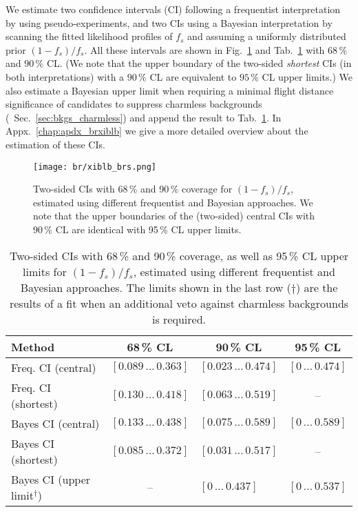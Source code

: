 We estimate two confidence intervals (CI) following a frequentist interpretation by using pseudo-experiments, and two CIs using a Bayesian interpretation by scanning the fitted likelihood profiles of $f_s$ and assuming a uniformly distributed prior $(1 - f_s) / f_s$.
All these intervals are shown in Fig.~\ref{fig:br_xiblb_brs} and Tab.~\ref{tab:br_xiblb_brs} with $68\,\%$ and $90\,\%$ CL.
(We note that the upper boundary of the two-sided \textit{shortest} CIs (in both interpretations) with a $90\,\%$ CL are equivalent to $95\,\%$ CL upper limits.)
We also estimate a Bayesian upper limit when requiring a minimal flight distance significance of \Dz candidates to suppress charmless \Xibz backgrounds (\cf{}~Sec.~\ref{sec:bkgs_charmless}) and append the result to Tab.~\ref{tab:br_xiblb_brs}.
In Appx.~\ref{chap:apdx_brxiblb} we give a more detailed overview about the estimation of these CIs.
\begin{figure}[htbp]
    \centering
    \texttt{[image: br/xiblb\_brs.png]}
    \caption{Two-sided CIs with 68\,\% and 90\,\% coverage for $(1 - f_s) / f_s$, estimated using different frequentist and Bayesian approaches. We note that the upper boundaries of the (two-sided) central CIs with 90\,\% CL are identical with 95\,\% CL upper limits.}
    \label{fig:br_xiblb_brs}
\end{figure}

\begin{table}[htbp]
    \centering
    \caption{Two-sided CIs with 68\,\% and 90\,\% coverage, as well as 95\,\% CL upper limits for $(1 - f_s) / f_s$, estimated using different frequentist and Bayesian approaches. The limits shown in the last row ($\dagger$) are the results of a fit when an additional veto against charmless \Xibz backgrounds is required.}
    \label{tab:br_xiblb_brs}
    \begin{tabular}{llll}
        \toprule
        Method & \multicolumn{1}{c}{68\,\% CL} & \multicolumn{1}{c}{90\,\% CL} & \multicolumn{1}{c}{95\,\% CL} \\
        \midrule
        Freq. CI (central) & $[0.089 \, \ldots \, 0.363]$ & $[0.023 \, \ldots \, 0.474]$ & $[0 \, \ldots \, 0.474]$ \\
        Freq. CI (shortest) & $[0.130 \, \ldots \, 0.418]$ & $[0.063 \, \ldots \, 0.519]$ & \multicolumn{1}{c}{--} \\
        Bayes CI (central) & $[0.133 \, \ldots \, 0.438]$ & $[0.075 \, \ldots \, 0.589]$ & $[0 \, \ldots \, 0.589]$ \\
        Bayes CI (shortest) & $[0.085 \, \ldots \, 0.372]$ & $[0.031 \, \ldots \, 0.517]$ & \multicolumn{1}{c}{--} \\
        Bayes CI (upper limit${}^\dagger$) & \multicolumn{1}{c}{--} & $[0 \, \ldots \, 0.437]$ & $[0 \, \ldots \, 0.537]$ \\
        \bottomrule
    \end{tabular}
\end{table}

